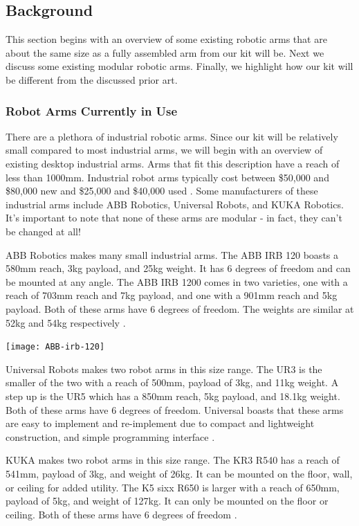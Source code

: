 \subsection{Background}
This section begins with an overview of some existing robotic arms that are about the same size as a fully assembled arm from our kit will be. Next we discuss some existing modular robotic arms. Finally, we highlight how our kit will be different from the discussed prior art.

\subsubsection{Robot Arms Currently in Use}
There are a plethora of industrial robotic arms. Since our kit will be relatively small compared to most industrial arms, we will begin with an overview of existing desktop industrial arms. Arms that fit this description have a reach of less than 1000mm. Industrial robot arms typically cost between \$50,000 and \$80,000 new and \$25,000 and \$40,000 used \cite{RobotWorx}. Some manufacturers of these industrial arms include ABB Robotics, Universal Robots, and KUKA Robotics. It's important to note that none of these arms are modular - in fact, they can't be changed at all!

ABB Robotics makes many small industrial arms. The ABB IRB 120 boasts a 580mm reach, 3kg payload, and 25kg weight. It has 6 degrees of freedom and can be mounted at any angle. The ABB IRB 1200 comes in two varieties, one with a reach of 703mm reach and 7kg payload, and one with a 901mm reach and 5kg payload. Both of these arms have 6 degrees of freedom. The weights are similar at 52kg and 54kg respectively \cite{RobotWorx}.

\texttt{[image: ABB-irb-120]}
\cite{IRB_120}

Universal Robots makes two robot arms in this size range. The UR3 is the smaller of the two with a reach of 500mm, payload of 3kg, and 11kg weight. A step up is the UR5 which has a 850mm reach, 5kg payload, and 18.1kg weight. Both of these arms have 6 degrees of freedom. Universal boasts that these arms are easy to implement and re-implement due to compact and lightweight construction, and simple programming interface \cite{RobotWorx}.

KUKA makes two robot arms in this size range. The KR3 R540 has a reach of 541mm, payload of 3kg, and weight of 26kg. It can be mounted on the floor, wall, or ceiling for added utility. The K5 sixx R650 is larger with a reach of 650mm, payload of 5kg, and weight of 127kg. It can only be mounted on the floor or ceiling. Both of these arms have 6 degrees of freedom \cite{RobotWorx}.

